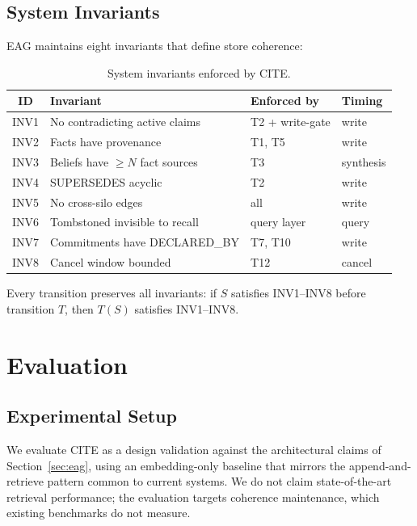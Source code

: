 \documentclass[11pt,letterpaper]{article}
\begin{document}
\subsection{System Invariants}

EAG maintains eight invariants that define store coherence:

\begin{table}[H]
\centering
\caption{System invariants enforced by CITE.}
\label{tab:invariants}
\begin{tabular}{@{}clll@{}}
\toprule
\textbf{ID} & \textbf{Invariant} & \textbf{Enforced by} & \textbf{Timing} \\
\midrule
INV1 & No contradicting active claims & T2 + write-gate & write \\
INV2 & Facts have provenance & T1, T5 & write \\
INV3 & Beliefs have $\geq N$ fact sources & T3 & synthesis \\
INV4 & SUPERSEDES acyclic & T2 & write \\
INV5 & No cross-silo edges & all & write \\
INV6 & Tombstoned invisible to recall & query layer & query \\
INV7 & Commitments have DECLARED\_BY & T7, T10 & write \\
INV8 & Cancel window bounded & T12 & cancel \\
\bottomrule
\end{tabular}
\end{table}

Every transition preserves all invariants: if $S$ satisfies INV1--INV8 before transition $T$, then $T(S)$ satisfies INV1--INV8.

\section{Evaluation}
\label{sec:eval}

\subsection{Experimental Setup}

We evaluate CITE as a design validation against the architectural claims of Section~\ref{sec:eag}, using an embedding-only baseline that mirrors the append-and-retrieve pattern common to current systems. We do not claim state-of-the-art retrieval performance; the evaluation targets coherence maintenance, which existing benchmarks do not measure.
\end{document}
